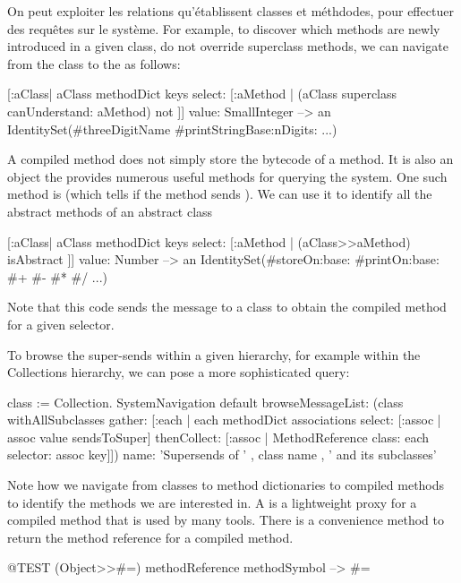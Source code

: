 \documentclass[a4paper,10pt,twoside]{book}
\begin{document}
On peut exploiter les relations qu'établissent classes et méthdodes, pour effectuer des requêtes sur le système.
For example, to discover which methods are newly introduced in a given class, \ie do not override superclass methods, we can navigate from the class to the  as follows:
\begin{code}{}
[:aClass| aClass methodDict keys select: [:aMethod |
  (aClass superclass canUnderstand: aMethod) not ]] value: SmallInteger
  --> an IdentitySet(#threeDigitName #printStringBase:nDigits: ...)
\end{code}

A compiled method does not simply store the bytecode of a method.
It is also an object the provides numerous useful methods for querying the system.
One such method is  (which tells if the method sends ).
We can use it to identify all the abstract methods of an abstract class
\begin{code}{}
[:aClass| aClass methodDict keys select: [:aMethod |
  (aClass>>aMethod) isAbstract ]] value: Number
  --> an IdentitySet(#storeOn:base: #printOn:base: #+ #- #* #/ ...)
\end{code}
Note that this code sends the \ct{>>} message to a class to obtain the compiled method for a given selector.


To browse the super-sends within a given hierarchy, for example within the Collections hierarchy, we can pose a more sophisticated query:
\begin{code}{}
class := Collection.
SystemNavigation default
  browseMessageList: (class withAllSubclasses gather: [:each |
    each methodDict associations
      select: [:assoc | assoc value sendsToSuper]
      thenCollect: [:assoc | MethodReference class: each selector: assoc key]])
  name: 'Supersends of ' , class name , ' and its subclasses'
\end{code}
Note how we navigate from classes to method dictionaries to compiled methods to identify the methods we are interested in.
A  is a lightweight proxy for a compiled method that is used by many tools.
There is a convenience method  to return the method reference for a compiled method.
\begin{code}{@TEST}
(Object>>#=) methodReference methodSymbol --> #=
\end{code}
\end{document}
